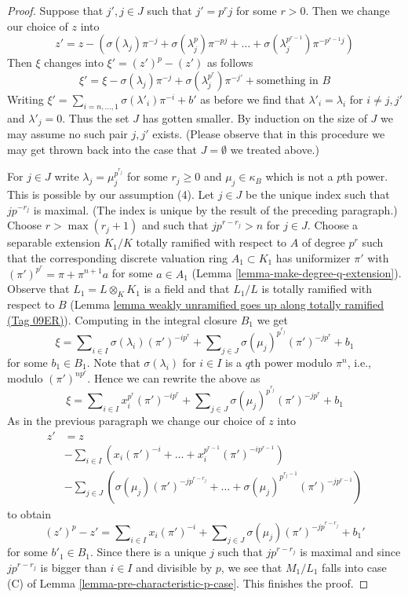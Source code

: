 \documentclass{amsart}
\theoremstyle{plain}
\theoremstyle{definition}
\theoremstyle{remark}
\numberwithin{equation}{subsection}
\begin{document}
\begin{proof}
\medskip\noindent
Suppose that $j', j \in J$ such that $j' = p^r j$ for some
$r > 0$. Then we change our choice of $z$ into
$$
z' = z -
(\sigma(\lambda_j) \pi^{-j} + \sigma(\lambda_j^p) \pi^{-pj} + \ldots +
\sigma(\lambda_j^{p^{r - 1}}) \pi^{-p^{r - 1}j})
$$
Then $\xi$ changes into $\xi' = (z')^p - (z')$ as follows
$$
\xi' =
\xi - \sigma(\lambda_j) \pi^{-j} + \sigma(\lambda_j^{p^r}) \pi^{-j'}
+ \text{something in }B
$$
Writing
$\xi' = \sum\nolimits_{i = n, \ldots, 1} \sigma(\lambda'_i) \pi^{-i} + b'$
as before we find that
$\lambda'_i = \lambda_i$ for $i \not = j, j'$ and $\lambda'_j = 0$.
Thus the set $J$ has gotten smaller.
By induction on the size of $J$ we may assume no such pair $j, j'$ exists.
(Please observe that in this procedure we may get thrown back into the case
that $J = \emptyset$ we treated above.)

\medskip\noindent
For $j \in J$ write $\lambda_j = \mu_j^{p^{r_j}}$ for some $r_j \geq 0$ and
$\mu_j \in \kappa_B$ which is not a $p$th power. This is possible by our
assumption (4). Let $j \in J$ be the unique index such that $j p^{-r_j}$
is maximal. (The index is unique by the result of the preceding paragraph.)
Choose $r > \max(r_j + 1)$ and such that $j p^{r - r_j} > n$ for $j \in J$.
Choose a separable extension $K_1/K$ totally ramified with respect to $A$
of degree $p^r$ such that the corresponding discrete valuation ring
$A_1 \subset K_1$ has uniformizer $\pi'$ with
$(\pi')^{p^r} = \pi + \pi^{n + 1}a$ for some $a \in A_1$
(Lemma \ref{lemma-make-degree-q-extension}).
Observe that $L_1 = L \otimes_K K_1$ is a field and that
$L_1/L$ is totally ramified with respect to $B$
(Lemma \href{https://stacks.math.columbia.edu/tag/09ER}{lemma weakly unramified goes up along totally ramified (Tag 09ER)}).
Computing in the integral closure $B_1$ we get
$$
\xi = \sum\nolimits_{i \in I} \sigma(\lambda_i) (\pi')^{-i p^r} +
\sum\nolimits_{j \in J} \sigma(\mu_j)^{p^{r_j}} (\pi')^{-j p^r} + b_1
$$
for some $b_1 \in B_1$. Note that $\sigma(\lambda_i)$ for $i \in I$
is a $q$th power modulo $\pi^n$, i.e., modulo $(\pi')^{n p^r}$.
Hence we can rewrite the above as
$$
\xi = \sum\nolimits_{i \in I} x_i^{p^r} (\pi')^{-i p^r} +
\sum\nolimits_{j \in J} \sigma(\mu_j)^{p^{r_j}} (\pi')^{- j p^r}
+ b_1
$$
As in the previous paragraph we change our choice of $z$ into
\begin{align*}
z' & = z \\
& -
\sum\nolimits_{i \in I}
\left(x_i (\pi')^{-i} + \ldots + x_i^{p^{r - 1}} (\pi')^{-i p^{r - 1}}\right)
\\
& -
\sum\nolimits_{j \in J}
\left(
\sigma(\mu_j) (\pi')^{- j p^{r - r_j}}
+ \ldots +
\sigma(\mu_j)^{p^{r_j - 1}} (\pi')^{- j p^{r - 1}}
\right)
\end{align*}
to obtain
$$
(z')^p - z' =
\sum\nolimits_{i \in I} x_i (\pi')^{-i} +
\sum\nolimits_{j \in J} \sigma(\mu_j) (\pi')^{- j p^{r - r_j}} + b_1'
$$
for some $b'_1 \in B_1$.
Since there is a unique $j$ such that $j p^{r - r_j}$ is maximal
and since $j p^{r - r_j}$ is bigger than $i \in I$ and divisible
by $p$, we see that $M_1 / L_1$ falls into case (C) of
Lemma \ref{lemma-pre-characteristic-p-case}.
This finishes the proof.
\end{proof}
\end{document}
